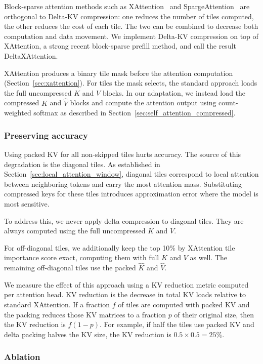 Block-sparse attention methods such as XAttention~\citep{xu2025xattention} and SpargeAttention~\citep{zhang2025spargeattn} are orthogonal to Delta-KV compression: one reduces the number of tiles computed, the other reduces the cost of each tile. The two can be combined to decrease both computation and data movement. We implement Delta-KV compression on top of XAttention, a strong recent block-sparse prefill method, and call the result DeltaXAttention.

XAttention produces a binary tile mask before the attention computation (Section~\ref{sec:xattention}). For tiles the mask selects, the standard approach loads the full uncompressed $K$ and $V$ blocks. In our adaptation, we instead load the compressed $\hat{K}$ and $\hat{V}$ blocks and compute the attention output using count-weighted softmax as described in Section~\ref{sec:self_attention_compressed}.
\subsubsection{Preserving accuracy}

Using packed KV for all non-skipped tiles hurts accuracy. The source of this degradation is the diagonal tiles. As established in Section~\ref{sec:local_attention_window}, diagonal tiles correspond to local attention between neighboring tokens and carry the most attention mass. Substituting compressed keys for these tiles introduces approximation error where the model is most sensitive.

To address this, we never apply delta compression to diagonal tiles. They are always computed using the full uncompressed $K$ and $V$.

For off-diagonal tiles, we additionally keep the top 10\% by XAttention tile importance score exact, computing them with full $K$ and $V$ as well. The remaining off-diagonal tiles use the packed $\hat{K}$ and $\hat{V}$.

We measure the effect of this approach using a KV reduction metric computed per attention head. KV reduction is the decrease in total KV loads relative to standard XAttention. If a fraction $f$ of tiles are computed with packed KV and the packing reduces those KV matrices to a fraction $p$ of their original size, then the KV reduction is $f(1-p)$. For example, if half the tiles use packed KV and delta packing halves the KV size, the KV reduction is $0.5 \times 0.5 = 25\%$.

\subsubsection{Ablation}
\label{sec:xattention_ablation}


